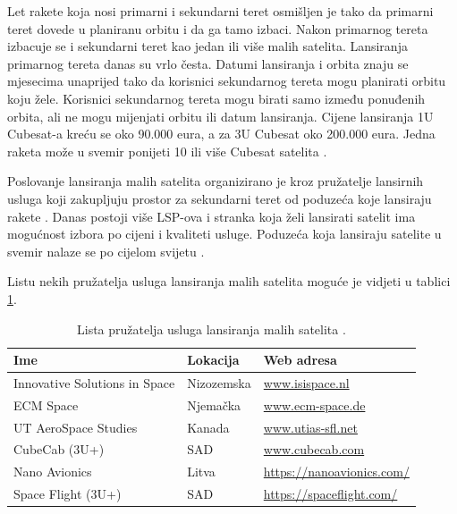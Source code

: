 \documentclass[times, utf8, diplomski, numeric]{templates/template}
\begin{document}
{{            Let rakete koja nosi primarni i sekundarni teret osmišljen je tako da primarni teret dovede u planiranu orbitu i da ga tamo izbaci. Nakon primarnog tereta izbacuje se i sekundarni teret kao jedan ili više malih satelita. Lansiranja primarnog tereta danas su vrlo česta. Datumi lansiranja i orbita znaju se mjesecima unaprijed tako da korisnici sekundarnog tereta mogu planirati orbitu koju žele. Korisnici sekundarnog tereta mogu birati samo između ponuđenih orbita, ali ne mogu mijenjati orbitu ili datum lansiranja. Cijene lansiranja 1U Cubesat-a kreću se oko 90.000 eura, a za 3U Cubesat oko 200.000 eura. Jedna raketa može u svemir ponijeti 10 ili više Cubesat satelita \cite{fersat}. 

            Poslovanje lansiranja malih satelita organizirano je kroz pružatelje lansirnih usluga  koji zakupljuju prostor za sekundarni teret od poduzeća koje lansiraju rakete . Danas postoji više LSP-ova i stranka koja želi lansirati satelit ima mogućnost izbora po cijeni i kvaliteti usluge. Poduzeća koja lansiraju satelite u svemir nalaze se po cijelom svijetu \cite{fersat}. 
            
            Listu nekih pružatelja usluga lansiranja malih satelita moguće je vidjeti u tablici \ref{tbl:pru_lan_uslu}.

            \begin{table}[htb]
            \caption{Lista pružatelja usluga lansiranja malih satelita \cite{fersat}.}
            \label{tbl:pru_lan_uslu}
            \centering
            \begin{tabular}{lll} 
            \toprule
            Ime & Lokacija & Web adresa \\ 
            \midrule
            Innovative Solutions in Space & Nizozemska & \url{www.isispace.nl} \\
            ECM Space & Njemačka & \url{www.ecm-space.de} \\
            UT AeroSpace Studies & Kanada & \url{www.utias-sfl.net} \\
            CubeCab (3U+) & SAD & \url{www.cubecab.com} \\
            Nano Avionics & Litva & \url{https://nanoavionics.com/} \\
            Space Flight (3U+) & SAD & \url{https://spaceflight.com/} \\
            \bottomrule
            \end{tabular}
            \end{table}

}}
\end{document}
